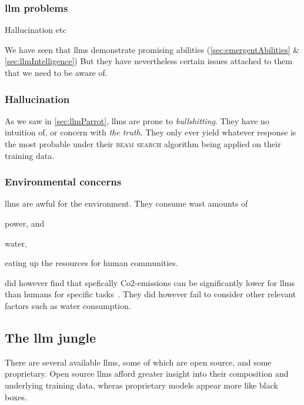 \subsubsection{\acrshort{llm} problems}\label{sec:llmProblems}

Hallucination etc

We have seen that \acrshort{llms} demonstrate promising abilities
(\cref{sec:emergentAbilities} \& \cref{sec:llmIntelligence}) But they have nevertheless
certain issues attached to them that we need to be aware of.

\subsubsection*{Hallucination}

As we saw in \cref{sec:llmParrot}, \acrshort{llms} are prone to
\textit{bullshitting}. They have no intuition of, or concern with \textit{the
    truth}. They only ever yield whatever response is the most probable under their
\textsc{beam search} algorithm being applied on their training data.

\subsubsection*{Environmental concerns}

\acrshort{llms} are awful for the environment. They consume wast amounts of \begin{inparaenum}
    \item power,
    and
    \item water,
\end{inparaenum}
eating up the resources for human communities.

\citeauthor{llmCarbon} did however find that spefically Co2-emissions can be
significantly lower for \acrshort{llms} than humans for specific
tasks~\cite{llmCarbon}. They did however fail to consider other relevant factors such
as water consumption.


\subsection{The \acrshort{llm} jungle}

There are several available \acrshort{llms}, some of which are open source, and some proprietary.
Open source \acrshort{llms} afford greater insight into their composition and underlying training
data, wheras proprietary models appear more like black boxes.


